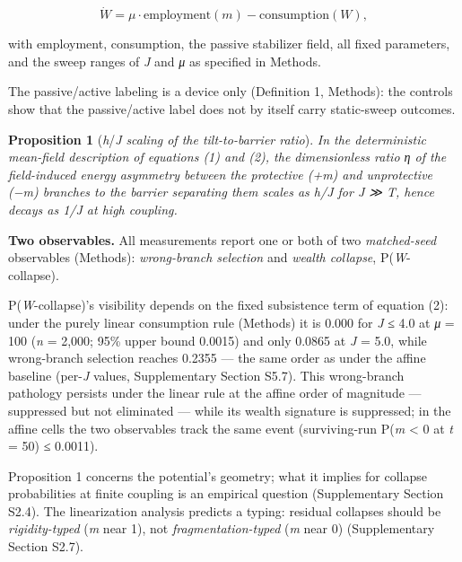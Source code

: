 \documentclass[11pt,letterpaper]{article}
\begin{document}
\begin{equation*}
\dot W = \mu \cdot \mathrm{employment}(m) - \mathrm{consumption}(W), \tag{2}
\end{equation*}


with employment, consumption, the passive stabilizer field, all fixed parameters, and the sweep ranges of \emph{J} and \emph{μ} as specified in Methods.

The passive/active labeling is a device only (Definition 1, Methods): the controls show that the passive/active label does not by itself carry static-sweep outcomes.

\textbf{Proposition 1} (\emph{h}/\emph{J} \emph{scaling of the tilt-to-barrier ratio}). \emph{In the deterministic mean-field description of equations (1) and (2), the dimensionless ratio η of the field-induced energy asymmetry between the protective (+m) and unprotective (−m) branches to the barrier separating them scales as h/J for J ≫ T, hence decays as 1/J at high coupling.}

\textbf{Two observables.} All measurements report one or both of two \emph{matched-seed} observables (Methods): \emph{wrong-branch selection} and \emph{wealth collapse}, P(\emph{W}-collapse).

P(\emph{W}-collapse)'s visibility depends on the fixed subsistence term of equation (2): under the purely linear consumption rule (Methods) it is 0.000 for \emph{J} ≤ 4.0 at \emph{μ} = 100 (\emph{n} = 2,000; 95\% upper bound 0.0015) and only 0.0865 at \emph{J} = 5.0, while wrong-branch selection reaches 0.2355 --- the same order as under the affine baseline (per-\emph{J} values, Supplementary Section S5.7). This wrong-branch pathology persists under the linear rule at the affine order of magnitude --- suppressed but not eliminated --- while its wealth signature is suppressed; in the affine cells the two observables track the same event (surviving-run P(\emph{m} \textless{} 0 at \emph{t} = 50) ≤ 0.0011).

Proposition 1 concerns the potential's geometry; what it implies for collapse probabilities at finite coupling is an empirical question (Supplementary Section S2.4). The linearization analysis predicts a typing: residual collapses should be \emph{rigidity-typed} (\textbar{}\emph{m}\textbar{} near 1), not \emph{fragmentation-typed} (\textbar{}\emph{m}\textbar{} near 0) (Supplementary Section S2.7).
\end{document}
